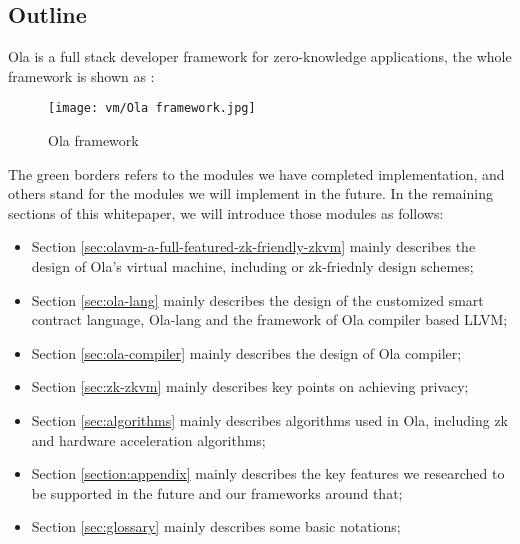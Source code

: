 \subsection{Outline}

Ola is a full stack developer framework for zero-knowledge applications, the whole framework is shown as :
\begin{figure}[!ht]
    \centering
    \texttt{[image: vm/Ola framework.jpg]}
    \caption{Ola framework}
    \label{fig:Ola framework}
\end{figure}

The green borders refers to the modules we have completed implementation, and others stand for the modules we will implement in the future. In the remaining sections of this whitepaper, we will introduce those modules 
as follows:
\begin{itemize}
    \item Section \ref{sec:olavm-a-full-featured-zk-friendly-zkvm} mainly describes the design of Ola's virtual machine, including or zk-friednly design schemes;
    \item Section \ref{sec:ola-lang} mainly describes the design of the customized smart contract language, Ola-lang and the framework of Ola compiler based LLVM;
    \item Section \ref{sec:ola-compiler} mainly describes the design of Ola compiler;
    \item Section \ref{sec:zk-zkvm} mainly describes key points on achieving privacy;
    \item Section \ref{sec:algorithms} mainly describes algorithms used in Ola, including zk and hardware acceleration algorithms;
    \item Section \ref{section:appendix} mainly describes the key features we researched to be supported in the future and our frameworks around that;
    \item Section \ref{sec:glossary} mainly describes some basic notations;
\end{itemize}
